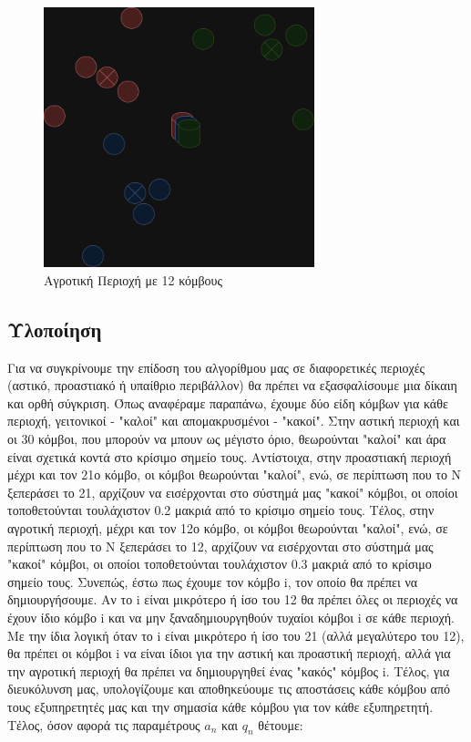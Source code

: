 \begin{figure}[H]
    \centering
    \includegraphics[width=0.7\textwidth]{figures/chapter2/rural.drawio.png}
    \caption{Αγροτική Περιοχή με 12 κόμβους}
    \label{fig49}
\end{figure}

\subsection{Υλοποίηση}

Για να συγκρίνουμε την επίδοση του αλγορίθμου μας σε διαφορετικές περιοχές (αστικό, προαστιακό ή υπαίθριο περιβάλλον) θα πρέπει να εξασφαλίσουμε μια δίκαιη και ορθή σύγκριση. Όπως αναφέραμε παραπάνω, έχουμε δύο είδη κόμβων για κάθε περιοχή, γειτονικοί - "καλοί" και απομακρυσμένοι - "κακοί". Στην αστική περιοχή και οι 30 κόμβοι, που μπορούν να μπουν ως μέγιστο όριο, θεωρούνται "καλοί" και άρα είναι σχετικά κοντά στο κρίσιμο σημείο τους. Αντίστοιχα, στην προαστιακή περιοχή μέχρι και τον 21ο κόμβο, οι κόμβοι θεωρούνται "καλοί", ενώ, σε περίπτωση που το Ν ξεπεράσει το 21, αρχίζουν να εισέρχονται στο σύστημά μας "κακοί" κόμβοι, οι οποίοι τοποθετούνται τουλάχιστον 0.2 μακριά από το κρίσιμο σημείο τους. Τέλος, στην αγροτική περιοχή, μέχρι και τον 12ο κόμβο, οι κόμβοι θεωρούνται "καλοί", ενώ, σε περίπτωση που το Ν ξεπεράσει το 12, αρχίζουν να εισέρχονται στο σύστημά μας "κακοί" κόμβοι, οι οποίοι τοποθετούνται τουλάχιστον 0.3 μακριά από το κρίσιμο σημείο τους. Συνεπώς, έστω πως έχουμε τον κόμβο i, τον οποίο θα πρέπει να δημιουργήσουμε. Αν το i είναι μικρότερο ή ίσο του 12 θα πρέπει όλες οι περιοχές να έχουν ίδιο κόμβο i και να μην ξαναδημιουργηθούν τυχαίοι κόμβοι i σε κάθε περιοχή. Με την ίδια λογική όταν το i είναι μικρότερο ή ίσο του 21 (αλλά μεγαλύτερο του 12), θα πρέπει οι κόμβοι i να είναι ίδιοι για την αστική και προαστική περιοχή, αλλά για την αγροτική περιοχή θα πρέπει να δημιουργηθεί ένας "κακός" κόμβος i. Τέλος, για διευκόλυνση μας, υπολογίζουμε και αποθηκεύουμε τις αποστάσεις κάθε κόμβου από τους εξυπηρετητές μας και την σημασία κάθε κόμβου για τον κάθε εξυπηρετητή. Τέλος, όσον αφορά τις παραμέτρους $a_n$ και $q_n$ θέτουμε:

